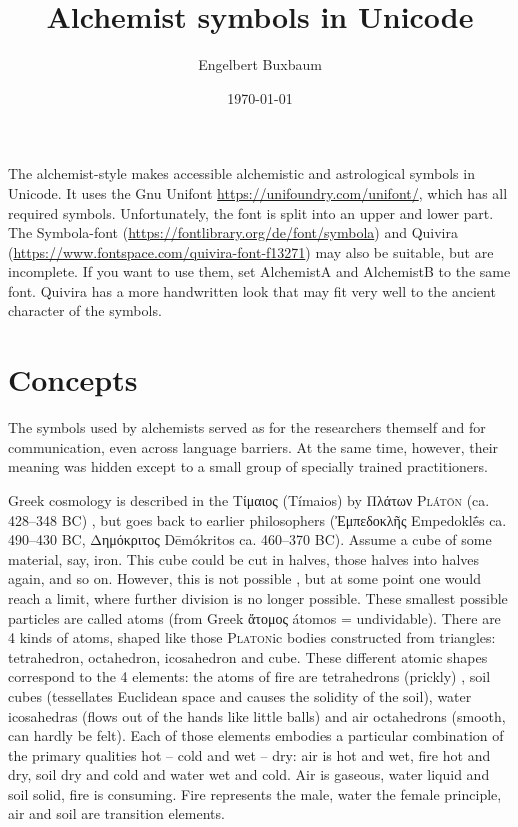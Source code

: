 \documentclass[notitlepage,british]{scrartcl}
\title{Alchemist symbols in Unicode}
\author{Engelbert Buxbaum}
\date{\today}
\begin{document}

\maketitle
\begin{refsection}

The alchemist-style  makes accessible alchemistic and astrological symbols in Unicode. It uses the Gnu Unifont \href{https://unifoundry.com/unifont/}{https://unifoundry.com/unifont/}, which has all required symbols. Unfortunately, the font is split into an upper and lower part. The Symbola-font (\href{https://fontlibrary.org/de/font/symbola}{https://fontlibrary.org/de/font/symbola}) and Quivira (\href{https://www.fontspace.com/quivira-font-f13271}{https://www.fontspace.com/quivira-font-f13271}) may also be suitable, but are incomplete. If you want to use them, set AlchemistA and AlchemistB to the same font. Quivira has a more handwritten look that may fit very well to the ancient character of the symbols.

\section{Concepts}

The symbols used by alchemists served as  for the researchers themself and for communication, even across language barriers. At the same time, however, their meaning was hidden except to a small group of specially trained practitioners.

Greek cosmology is described in the \foreignlanguage{greek}{Τίμαιος} (Tímaios) by \foreignlanguage{greek}{Πλάτων} \textsc{Plátōn} (ca. \num{428}--\num{348} BC) \parencite{Pla-40}, but goes back to earlier philosophers (\foreignlanguage{greek}{Ἐμπεδοκλῆς} Empedoklḗs ca. \num{490}--\num{430} BC, \foreignlanguage{greek}{Δημόκριτος} Dēmókritos ca. \num{460}--\num{370} BC). Assume a cube of some material, say, iron. This cube could be cut in halves, those halves into halves again, and so on. However, this is not possible , but at some point one would reach a limit, where further division is no longer possible. These smallest possible particles are called atoms (from Greek \foreignlanguage{greek}{ἄτομος} átomos = undividable). There are \num{4} kinds of atoms, shaped like those \textsc{Platon}ic bodies constructed from triangles: tetrahedron, octahedron, icosahedron and cube. These different atomic shapes correspond to the 4 elements: the atoms of fire are tetrahedrons (prickly) , soil cubes (tessellates Euclidean space and causes the solidity of the soil), water icosahedras (flows out of the hands like little balls) and air octahedrons (smooth, can hardly be felt). Each of those elements embodies a particular combination of the primary qualities hot -- cold and wet -- dry: air is hot and wet, fire hot and dry, soil dry and cold and water wet and cold. Air is gaseous, water liquid and soil solid, fire is consuming. Fire represents the male, water the female principle, air and soil are transition elements.


\end{refsection}
\end{document}
